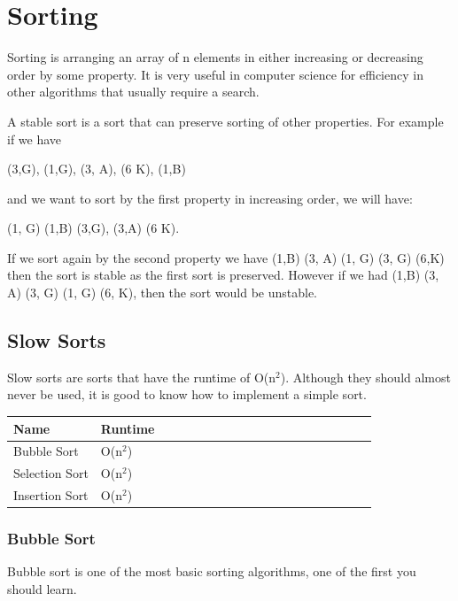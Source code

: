 \documentclass[11pt,oneside]{book}
\begin{document}
\part{ Sorting }
    

Sorting is arranging an array of n elements in either increasing or decreasing order by some property. It is very useful in computer science for efficiency in other algorithms that usually require a search.

A stable sort is a sort that can preserve sorting of other properties. For example if we have

(3,G), (1,G), (3, A), (6 K), (1,B)

and we want to sort by the first property in increasing order, we will have:

(1, G) (1,B) (3,G), (3,A) (6 K).

If we sort again by the second property we have (1,B) (3, A) (1, G) (3, G) (6,K) then the sort is stable as the first sort is preserved. However if we had (1,B) (3, A) (3, G) (1, G) (6, K), then the sort would be unstable.


    \chapter{ Slow Sorts }
        

Slow sorts are sorts that have the runtime of O(n$^{2}$). Although they should almost never be used, it is good to know how to implement a simple sort.

\vspace{10px}\begin{tabulary}{0.4\linewidth}{|l|l|l|l|l|l|l|l|l|l|l|l|l|l|l|l|l|l|l}\hline


  Name &
  Runtime\\
\hline


  Bubble Sort &
  O(n$^{2}$)\\

  Selection Sort &
  O(n$^{2}$)\\

  Insertion Sort &
  O(n$^{2}$)\\

\hline\end{tabulary}


        \section{ Bubble Sort }
        

Bubble sort is one of the most basic sorting algorithms, one of the first you should learn.
\end{document}
